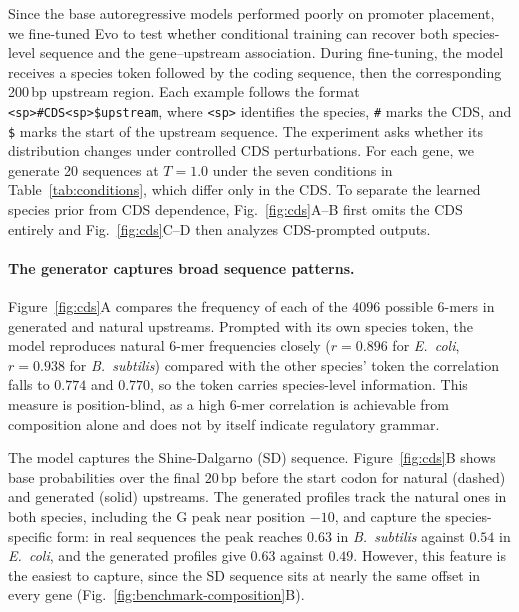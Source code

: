 \documentclass{article}
\begin{document}
Since the base autoregressive models performed poorly on promoter placement,
we fine-tuned Evo to test whether conditional training can recover both
species-level sequence and the gene--upstream association. During fine-tuning,
the model receives a species token followed by the coding sequence, then the
corresponding 200\,bp upstream region. Each example follows the format
\texttt{<sp>\#CDS<sp>\$upstream}, where \texttt{<sp>} identifies the species,
\texttt{\#} marks the CDS, and \texttt{\$} marks the start of the upstream
sequence. The experiment asks whether its distribution changes under controlled
CDS perturbations. For each gene, we generate 20 sequences at $T=1.0$ under the
seven conditions in Table~\ref{tab:conditions}, which differ only in the CDS. To separate the learned species prior
from CDS dependence, Fig.~\ref{fig:cds}A--B first omits the CDS entirely and
Fig.~\ref{fig:cds}C--D then analyzes CDS-prompted outputs.

\paragraph{The generator captures broad sequence patterns.}
Figure~\ref{fig:cds}A compares the frequency of each of the $4096$ possible
6-mers in generated and natural upstreams. Prompted with its own species token,
the model reproduces natural 6-mer frequencies closely ($r=0.896$ for
\emph{E.~coli}, $r=0.938$ for \emph{B.~subtilis}) compared with the other species' token
the correlation falls to $0.774$ and $0.770$, so the token carries species-level
information. This measure is position-blind, as a high 6-mer correlation is
achievable from composition alone and does not by itself indicate regulatory
grammar. 

The model captures the Shine-Dalgarno (SD) sequence. Figure~\ref{fig:cds}B shows base
probabilities over the final $20$\,bp before the start codon for natural (dashed)
and generated (solid) upstreams. The generated profiles track the natural ones in
both species, including the G peak near position $-10$, and capture the species-specific form: in real sequences the
peak reaches $0.63$ in \emph{B.~subtilis} against $0.54$ in \emph{E.~coli}, and
the generated profiles give $0.63$ against $0.49$. However, this feature is the easiest to capture, since the SD sequence sits at nearly the same offset in every gene
(Fig.~\ref{fig:benchmark-composition}B).
\end{document}
